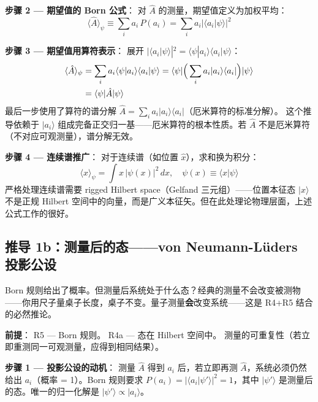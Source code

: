 \textbf{步骤 2 — 期望值的 Born 公式}：\fbox{[S]} 对 $\hat{A}$ 的测量，期望值定义为加权平均：
\begin{equation}
\langle\hat{A}\rangle_\psi \equiv \sum_i a_i\,P(a_i) = \sum_i a_i|\langle a_i|\psi\rangle|^2
\end{equation}

\textbf{步骤 3 — 期望值用算符表示}：\fbox{[S]} 展开 $|\langle a_i|\psi\rangle|^2 = \langle\psi|a_i\rangle\langle a_i|\psi\rangle$：
\begin{align}
\langle\hat{A}\rangle_\psi &= \sum_i a_i \langle\psi|a_i\rangle\langle a_i|\psi\rangle
= \langle\psi|\Big(\sum_i a_i|a_i\rangle\langle a_i|\Big)|\psi\rangle \notag \\
&= \langle\psi|\hat{A}|\psi\rangle
\end{align}
\fbox{[S]} 最后一步使用了算符的谱分解 $\hat{A} = \sum_i a_i|a_i\rangle\langle a_i|$（厄米算符的标准分解）。\fbox{[N]} 这个推导依赖于 $|a_i\rangle$ 组成完备正交归一基——厄米算符的根本性质。若 $\hat{A}$ 不是厄米算符（不对应可观测量），谱分解无效。

\textbf{步骤 4 — 连续谱推广}：\fbox{[S]} 对于连续谱（如位置 $\hat{x}$），求和换为积分：
\begin{equation}
\boxed{\langle\hat{x}\rangle_\psi = \int x\,|\psi(x)|^2\,dx, \quad \psi(x) \equiv \langle x|\psi\rangle}
\end{equation}
\fbox{[N]} 严格处理连续谱需要 rigged Hilbert space（Gelfand 三元组）——位置本征态 $|x\rangle$ 不是正规 Hilbert 空间中的向量，而是广义本征矢。但在此处理论物理层面，上述公式工作的很好。

\subsection{推导 1b：测量后的态——von Neumann-Lüders 投影公设}

Born 规则给出了概率。但测量后系统处于什么态？经典的测量不会改变被测物——你用尺子量桌子长度，桌子不变。量子测量\textbf{会}改变系统——这是 R4+R5 结合的必然推论。

\textbf{前提}：\fbox{[N]} R5 — Born 规则。\fbox{[N]} R4a — 态在 Hilbert 空间中。\fbox{[N]} 测量的可重复性（若立即重测同一可观测量，应得到相同结果）。

\textbf{步骤 1 — 投影公设的动机}：\fbox{[S]} 测量 $\hat{A}$ 得到 $a_i$ 后，若立即再测 $\hat{A}$，系统必须仍然给出 $a_i$（概率 = 1）。Born 规则要求 $P(a_i) = |\langle a_i|\psi'\rangle|^2 = 1$，其中 $|\psi'\rangle$ 是测量后的态。唯一的归一化解是 $|\psi'\rangle \propto |a_i\rangle$。


